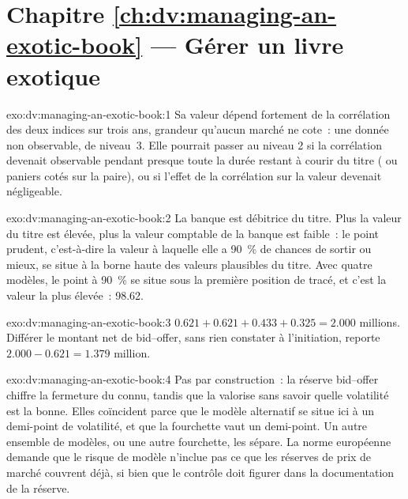 \section*{Chapitre \ref{ch:dv:managing-an-exotic-book} --- Gérer un livre exotique}

\begin{solution}{exo:dv:managing-an-exotic-book:1}
Sa valeur dépend fortement de la corrélation des deux indices sur trois ans, grandeur qu'aucun marché ne cote~: une donnée non observable, de niveau~3. Elle pourrait passer au
niveau 2 si la corrélation devenait observable pendant presque toute la durée restant à courir du titre ( ou paniers cotés sur la paire), ou si l'effet de
la corrélation sur la valeur devenait négligeable.
\end{solution}

\begin{solution}{exo:dv:managing-an-exotic-book:2}
La banque est débitrice du titre. Plus la valeur du titre est élevée, plus la valeur comptable de la banque est faible~: le point prudent, c'est-à-dire la valeur à laquelle elle a 90~\% de chances de sortir ou mieux, se situe à
la borne haute des valeurs plausibles du titre. Avec quatre modèles, le point à 90~\% se situe sous la première position de tracé, et c'est la valeur la plus élevée~: 98.62.
\end{solution}

\begin{solution}{exo:dv:managing-an-exotic-book:3}
$0.621+0.621+0.433+0.325=2.000$ millions. Différer le montant net de bid--offer, sans rien constater à l'initiation, reporte $2.000-0.621=1.379$ million.
\end{solution}

\begin{solution}{exo:dv:managing-an-exotic-book:4}
Pas par construction~: la réserve bid--offer chiffre la fermeture du  connu, tandis que la  valorise sans savoir quelle volatilité est la bonne. Elles coïncident
parce que le modèle alternatif se situe ici à un demi-point de volatilité, et que la fourchette vaut un demi-point. Un autre ensemble de modèles, ou une autre fourchette, les sépare.
La norme européenne demande que le risque de modèle n'inclue pas ce que les réserves de prix de marché couvrent déjà, si bien que le contrôle doit figurer dans la documentation de la réserve.
\end{solution}

